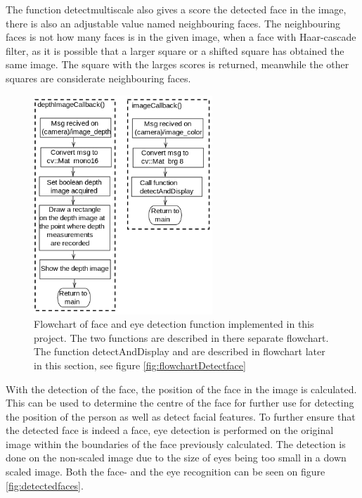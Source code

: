 The function detectmultiscale also gives a score the detected face in the image, there is also an adjustable value named neighbouring faces. The neighbouring faces is not how many faces is in the given image, when a face with Haar-cascade filter, as it is possible that a larger square or a shifted square has obtained the same image. The square with the larges scores is returned, meanwhile the other squares are considerate neighbouring faces.
\begin{figure}[H]
    \centering
    \includegraphics[width=0.6\textwidth]{figures/callback_face_flow.png}
    \caption{Flowchart of face and eye detection function implemented in this project. The two functions are described in there separate flowchart. The function detectAndDisplay and are described in flowchart later in this section, see figure \ref{fig:flowchartDetectface}}
    \label{fig:flowchartCallbacks}
\end{figure}




 With the detection of the face, the position of the face in the image is calculated. This can be used to determine the centre of the face for further use for detecting the position of the person as well as detect facial features. To further ensure that the detected face is indeed a face, eye detection is performed on the original image within the boundaries of the face previously calculated. The detection is done on the non-scaled image due to the size of eyes being too small in a down scaled image. Both the face- and the eye recognition can be seen on figure \ref{fig:detectedfaces}. 

